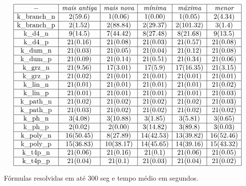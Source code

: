 \begin{table*}[t]
	\[
\begin{array}{|c|c|c|c|c|c|}
	\hline - & \textit{mais antiga} & \textit{mais nova} & \textit{mínima} & \textit{máxima} & \textit{menor} \\

	\hline \textnormal{k\_branch\_n} & 2(59.6) & 1(0.06) & 1(0.00) & 1(0.05) & 2(4.34) \\
	\hline \textnormal{k\_branch\_p} & 2(1.52) & 2(88.84) & 2(29.37)& 2(101.32) & 3(1.4) \\
	\hline \textnormal{k\_d4\_n} & 9(14.5) & 7(44.42) & 8(27.48)& 8(21.68) & 9(13.5) \\
	\hline \textnormal{k\_d4\_p} & 21(0.16) & 21(0.08) & 21(0.03) & 21(0.57) & 21(0.08) \\
	\hline \textnormal{k\_dum\_n} & 21(0.03) & 21(0.05) & 21(0.04) & 21(0.12) & 21(0.08) \\
	\hline \textnormal{k\_dum\_p} & 21(0.09) & 21(0.14) & 21(0.51) & 21(0.34) & 21(0.06) \\
	\hline \textnormal{k\_grz\_n} & 21(9.56) & 17(3.01) & 17(5.9) & 17(16.35) & 21(3.15) \\
	\hline \textnormal{k\_grz\_p} & 21(0.02) & 21(0.01) & 21(0.01) & 21(0.01) & 21(0.01) \\
	\hline \textnormal{k\_lin\_n} & 21(0.01) & 21(0.01) & 21(0.01) & 21(0.01) & 21(0.02) \\
	\hline \textnormal{k\_lin\_p} & 21(0.01) & 21(0.01) & 21(0.01) & 21(0.01) & 21(0.03) \\
	\hline \textnormal{k\_path\_n} & 21(0.02) & 21(0.02) & 21(0.02) & 21(0.02) & 21(0.03) \\
	\hline \textnormal{k\_path\_p} & 21(0.03) & 21(0.02) & 21(0.02) & 21(0.02) & 21(0.02) \\
	\hline \textnormal{k\_ph\_n} & 3(4.08) & 3(10.88) & 3(1.85) & 3(5.81) & 3(0.65) \\
	\hline \textnormal{k\_ph\_p} & 2(0.02) & 2(0.00) & 3(14.82) & 3(89.8) & 3(0.03) \\
	\hline \textnormal{k\_poly\_n} & 16(50.45) & 8(27.89) & 14(42.53) & 13(39.82) & 16(52.46) \\
	\hline \textnormal{k\_poly\_p} & 15(36.83) & 10(38.17) & 14(45.65) & 14(39.16) & 15(43.32) \\
	\hline \textnormal{k\_t4p\_n} & 21(0.06) & 21(0.16) & 21(0.1) & 21(0.06) & 21(0.05) \\
	\hline \textnormal{k\_t4p\_p} & 21(0.04) & 21(0.1) & 21(0.03) & 21(0.04) & 21(0.02) \\
	
	\hline
\end{array}
	\]
\caption{Fórmulas resolvidas em até 300 seg e tempo médio em segundos.}
\label{table:primeiro10}
\end{table*}

